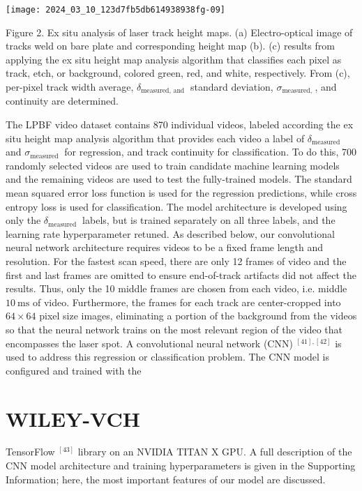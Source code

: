 \documentclass[10pt]{article}
\begin{document}
\begin{center}
\texttt{[image: 2024\_03\_10\_123d7fb5db614938938fg-09]}
\end{center}

Figure 2. Ex situ analysis of laser track height maps. (a) Electro-optical image of tracks weld on bare plate and corresponding height map (b). (c) results from applying the ex situ height map analysis algorithm that classifies each pixel as track, etch, or background, colored green, red, and white, respectively. From (c), per-pixel track width average, $\delta_{\text {measured, and }}$ standard deviation, $\sigma_{\text {measured, }}$, and continuity are determined.

The LPBF video dataset contains 870 individual videos, labeled according the ex situ height map analysis algorithm that provides each video a label of $\delta_{\text {measured }}$ and $\sigma_{\text {measured }}$ for regression, and track continuity for classification. To do this, 700 randomly selected videos are used to train candidate machine learning models and the remaining videos are used to test the fully-trained models. The standard mean squared error loss function is used for the regression predictions, while cross entropy loss is used for classification. The model architecture is developed using only the $\delta_{\text {measured }}$ labels, but is trained separately on all three labels, and the learning rate hyperparameter retuned. As described below, our convolutional neural network architecture requires videos to be a fixed frame length and resolution. For the fastest scan speed, there are only 12 frames of video and the first and last frames are omitted to ensure end-of-track artifacts did not affect the results. Thus, only the 10 middle frames are chosen from each video, i.e. middle $10 \mathrm{~ms}$ of video. Furthermore, the frames for each track are center-cropped into $64 \times 64$ pixel size images, eliminating a portion of the background from the videos so that the neural network trains on the most relevant region of the video that encompasses the laser spot. A convolutional neural network (CNN) ${ }^{[41],[42]}$ is used to address this regression or classification problem. The CNN model is configured and trained with the

\section*{WILEY-VCH}
TensorFlow ${ }^{[43]}$ library on an NVIDIA TITAN X GPU. A full description of the CNN model architecture and training hyperparameters is given in the Supporting Information; here, the most important features of our model are discussed.
\end{document}
